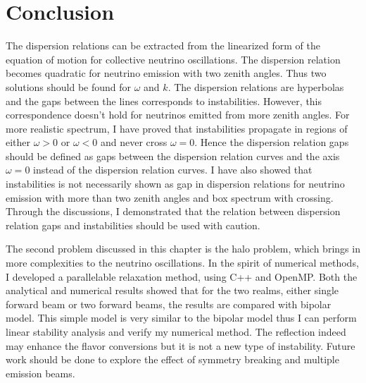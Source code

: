 

\section{\label{chap:collective-sec:conclusion}Conclusion}


The dispersion relations can be extracted from the linearized form of the equation of motion for collective neutrino oscillations. The dispersion relation becomes quadratic for neutrino emission with two zenith angles. Thus two solutions should be found for $\omega$ and $k$. The dispersion relations are hyperbolas and the gaps between the lines corresponds to instabilities. However, this correspondence doesn't hold for neutrinos emitted from more zenith angles. For more realistic spectrum, I have proved that instabilities propagate in regions of either $\omega>0$ or $\omega<0$ and never cross $\omega=0$. Hence the dispersion relation gaps should be defined as gaps between the dispersion relation curves and the axis $\omega=0$ instead of the dispersion relation curves. I have also showed that instabilities is not necessarily shown as gap in dispersion relations for neutrino emission with more than two zenith angles and box spectrum with crossing. Through the discussions, I demonstrated that the relation between dispersion relation gaps and instabilities should be used with caution.


The second problem discussed in this chapter is the halo problem, which brings in more complexities to the neutrino oscillations. In the spirit of numerical methods, I developed a parallelable relaxation method, using C++ and OpenMP. Both the analytical and numerical results showed that for the two realms, either single forward beam or two forward beams, the results are compared with bipolar model. This simple model is very similar to the bipolar model thus I can perform linear stability analysis and verify my numerical method. The reflection indeed may enhance the flavor conversions but it is not a new type of instability. Future work should be done to explore the effect of symmetry breaking and multiple emission beams.
